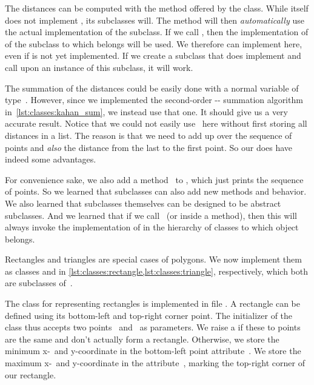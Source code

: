 The distances can be computed with the  method offered by the  class.
While  itself does not implement , its subclasses will.
The method  will then \emph{automatically} use the actual implementation of the subclass.
If we call , then the implementation of  of the subclass to which  belongs will be used.
We therefore can implement  here, even if  is not yet implemented.
If we create a subclass that does implement  and call  upon an instance of this subclass, it will work.

The summation of the distances could be easily done with a normal variable of type~.
However, since we implemented the second-order \citeauthor{K1965PFRORTE}-\citeauthor{B1968NSIMA}-\citeauthor{N1974REVZSES} summation algorithm in~\cref{lst:classes:kahan_sum}, we instead use that one.
It should give us a very accurate result.
Notice that we could not easily use~ here without first storing all distances in a list.
The reason is that we need to add up over the sequence of points and \emph{also} the distance from the last to the first point.
So our  does have indeed some advantages.

For convenience sake, we also add a method~ to , which just prints the sequence of points.
So we learned that subclasses can also add new methods and behavior.
We also learned that subclasses themselves can be designed to be abstract subclasses.
And we learned that if we call ~(or  inside a method), then this will always invoke the  implementation of  in the hierarchy of classes to which object~ belongs.

Rectangles and triangles are special cases of polygons.
We now implement them as classes  and  in \cref{lst:classes:rectangle,lst:classes:triangle}, respectively, which both are subclasses of~.

The class  for representing rectangles is implemented in file .
A rectangle can be defined using its bottom-left and top-right corner point.
The initializer  of the class  thus accepts two points~ and~ as parameters.
We raise a  if these to points are the same and don't actually form a rectangle.
Otherwise, we store the minimum x\nobreakdashes-~and y\nobreakdashes-coordinate in the bottom-left point attribute~.
We store the maximum x\nobreakdashes-~and y\nobreakdashes-coordinate in the attribute~, marking the top-right corner of our rectangle.

